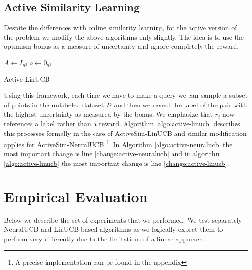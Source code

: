 \documentclass{article}
\begin{document}
  \subsection{Active Similarity Learning}
  Despite the differences with online similarity learning, for the active version of the problem we modify the above algorithms only slightly.
  The idea is to use the optimism bonus as a measure of uncertainty and ignore completely the reward.
\begin{algorithm}
    $A \gets I_{n^2}$\;
    $b \gets 0_{n^2}$\;
    \caption{Active-LinUCB}\label{algo:active-linucb}
\end{algorithm}

Using this framework, each time we have to make a query we can sample a subset of points in the unlabeled dataset $D$  and then we reveal the label of the pair with the highest uncertainty as measured by the bonus.
We emphasize that $r_t$ now references a label rather than a reward.
Algorithm \ref{algo:active-linucb} describes this processes formally in the case of ActiveSim-LinUCB and similar modification applies for ActiveSim-NeuralUCB \footnote{A precise implementation can be found in the appendix}.
In Algorithm \ref{algo:active-neuralucb} the most important change is line \ref{change:active-neuralucb} and in algorithm
\ref{algo:active-linucb} the most important change is line \ref{change:active-linucb}.

\section{Empirical Evaluation}
Below we describe the set of experiments that we performed.
We test separately NeuralUCB and LinUCB based algorithms as we logically expect them to perform
very differently due to the limitations of a linear approach.
\end{document}
